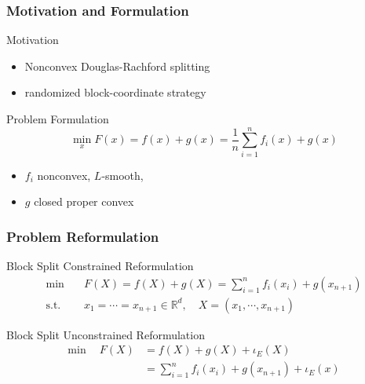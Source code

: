 
\begin{frame}
\frametitle{Motivation and Formulation}

\begin{block}{Motivation}
\begin{itemize}
    \item Nonconvex Douglas-Rachford splitting
    \item randomized block-coordinate strategy
\end{itemize}
\end{block}

\begin{block}{Problem Formulation}
\ 
\vspace{-1.3em}
$$\min_x F(x) = f(x) + g(x) = \frac{1}{n} \sum_{i=1}^n f_i(x) + g(x)$$
\vspace{-1.3em}
\begin{itemize}
    \item $f_i$ nonconvex, $L$-smooth,
    \item $g$ closed proper convex
\end{itemize}
\end{block}


\end{frame}


\begin{frame}
\frametitle{Problem Reformulation}

\begin{block}{Block Split Constrained Reformulation}
\ 
\vspace{-1.3em}
\begin{align*}
    \text{min} & \quad F(X) = f(X) + g(X) = \sum_{i=1}^n f_i(x_i) + g(x_{n+1}) \\
    \text{s.t.} & \quad x_1 = \cdots = x_{n+1} \in \mathbb{R}^d, \quad X = (x_1, \cdots, x_{n+1})
\end{align*}
\end{block}

\begin{block}{Block Split Unconstrained Reformulation}
\ 
\vspace{-1.3em}
\begin{align*}
    \text{min} \ \quad F(X) & = f(X) + g(X) + \iota_E(X) \\
    & = \sum_{i=1}^n f_i(x_i) + g(x_{n+1}) + \iota_E(x)
\end{align*}
\end{block}

\end{frame}

